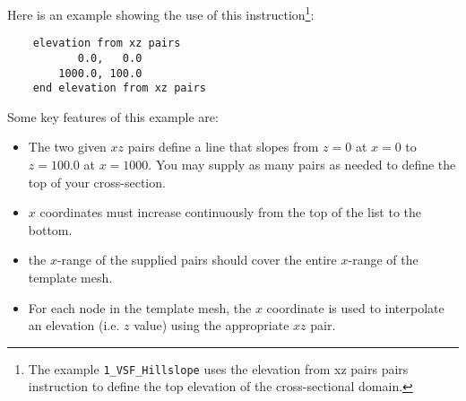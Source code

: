 Here is an example showing the use of this instruction\footnote{The example \texttt{1\_VSF\_Hillslope} uses the \textsf{elevation from xz pairs} pairs instruction to define the top elevation of the cross-sectional domain.}:
    \begin{verbatim}
    elevation from xz pairs
           0.0,   0.0
        1000.0, 100.0
    end elevation from xz pairs
     \end{verbatim}
     \squish
Some key features of this example are:
\begin{itemize}
  \item The two given $xz$ pairs define a line that slopes from $z=0$ at $x=0$ to $z=100.0$ at $x=1000$.  You may supply as many pairs as needed to define the top of your cross-section.
  \item $x$ coordinates must increase continuously from the top of the list to the bottom.
  \item the $x$-range of the supplied pairs should cover the entire $x$-range of the template mesh.
  \item For each node in the template mesh, the $x$ coordinate is used to interpolate an elevation (i.e. $z$ value) using the appropriate $xz$ pair.
\end{itemize}

\pagebreak
